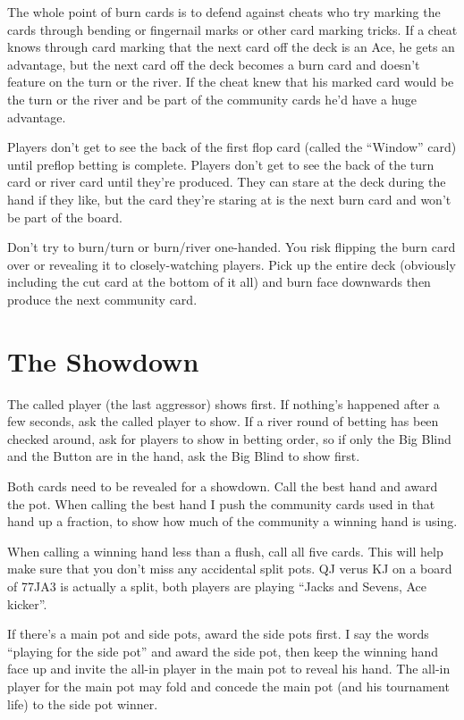 The whole point of burn cards is to
defend against cheats who try marking the cards through bending or
fingernail marks or other card marking tricks.
If a cheat knows through card marking that the next card off the deck
is an Ace, he gets an advantage, but the next card off the deck
becomes a burn card and doesn't feature on the turn or the river.
If the cheat knew that his marked card would be the turn or the river
and be part of the community cards he'd have a huge advantage.

Players don't get to see the back of the first flop card (called
the ``Window'' card) until preflop betting is complete. Players
don't get to see the back of the turn card or river card until
they're produced. They can stare at the deck during the hand
if they like, but the card they're staring at is the next burn card
and won't be part of the board.

Don't try to burn/turn or burn/river one-handed. You risk flipping the
burn card over or revealing it to closely-watching players. Pick up
the entire deck (obviously including the cut card at the bottom of it
all) and burn face downwards then produce the next community card.

\section{The Showdown}

The called player (the last aggressor) shows first.
If nothing's happened after a few seconds, ask the called player to show.
If a river round of betting has been checked around, ask for
players to show in betting order, so if only the Big Blind and the Button
are in the hand, ask the Big Blind to show first.

Both cards need to be revealed for a showdown. Call the best
hand and award the pot. When calling the best hand I push the community
cards used in that hand up a fraction, to show how much of the community
a winning hand is using.

When calling a winning hand less than a flush, call all five cards.
This will help make sure that you don't miss any accidental split pots.
QJ verus KJ on a board of 77JA3 is actually a split, both players are
playing ``Jacks and Sevens, Ace kicker''.

If there's a main pot and side pots, award the side pots first.
I say the words ``playing for the side pot'' and award the side
pot, then keep the winning hand face up and invite the all-in
player in the main pot to reveal his hand. The all-in player
for the main pot may fold and concede the main pot (and his
tournament life) to the side pot winner.

